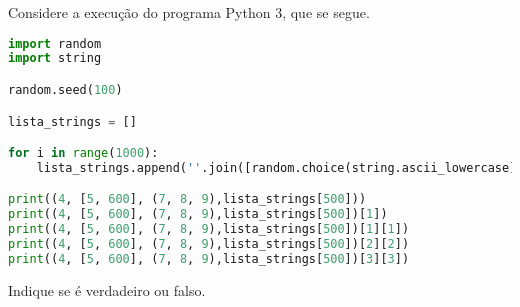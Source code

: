 \documentclass[12pt,varwidth=16cm,border=17pt]{standalone}
\begin{document}
Considere a execução do programa Python 3, que se segue. 

\begin{lstlisting}[language=Python]
import random
import string

random.seed(100)

lista_strings = []

for i in range(1000):
	lista_strings.append(''.join([random.choice(string.ascii_lowercase) for i in range(6)]))

print((4, [5, 600], (7, 8, 9),lista_strings[500]))
print((4, [5, 600], (7, 8, 9),lista_strings[500])[1])
print((4, [5, 600], (7, 8, 9),lista_strings[500])[1][1])
print((4, [5, 600], (7, 8, 9),lista_strings[500])[2][2])
print((4, [5, 600], (7, 8, 9),lista_strings[500])[3][3])
\end{lstlisting}

Indique se é verdadeiro ou falso.
\end{document}
